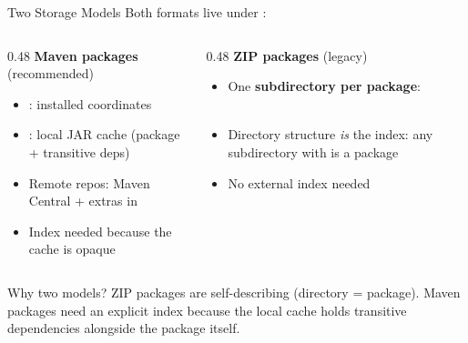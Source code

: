 \begin{frame}{Two Storage Models}
Both formats live under :

\vspace{0.5em}
\begin{columns}[T]
\begin{column}{0.48\textwidth}
\textbf{Maven packages} (recommended)
\begin{itemize}
\item {}: installed coordinates
\item {}: local JAR cache (package + transitive deps)
\item Remote repos: Maven Central + extras in 
\item Index needed because the cache is opaque
\end{itemize}
\end{column}
\begin{column}{0.48\textwidth}
\textbf{ZIP packages} (legacy)
\begin{itemize}
\item One \textbf{subdirectory per package}:\\
  \\
\item Directory structure \emph{is} the index: any subdirectory with  is a package
\item No external index needed
\end{itemize}
\end{column}
\end{columns}

\vspace{0.5em}
\begin{block}{Why two models?}
ZIP packages are self-describing (directory = package). Maven packages need an explicit index because the local cache holds transitive dependencies alongside the package itself.
\end{block}
\end{frame}

